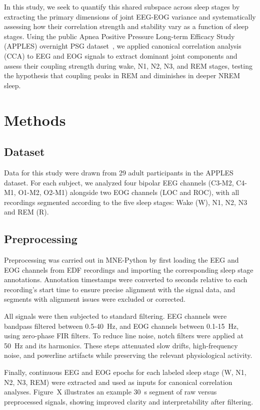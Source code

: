 In this study, we seek to quantify this shared subspace across sleep stages by extracting the primary dimensions of joint EEG-EOG variance and systematically assessing how their correlation strength and stability vary as a function of sleep stages. Using the public Apnea Positive Pressure Long-term Efficacy Study (APPLES) overnight PSG dataset~\cite{mueller_nsrr}, we applied canonical correlation analysis (CCA) to EEG and EOG signals to extract dominant joint components and assess their coupling strength during wake, N1, N2, N3, and REM stages, testing the hypothesis that coupling peaks in REM and diminishes in deeper NREM sleep.
 
\section{Methods}

\subsection{Dataset}

Data for this study were drawn from 29 adult participants in the APPLES dataset. For each subject, we analyzed four bipolar EEG channels (C3-M2, C4-M1, O1-M2, O2-M1) alongside two EOG channels (LOC and ROC), with all recordings segmented according to the five sleep stages: Wake (W), N1, N2, N3 and REM (R).

\subsection{Preprocessing}
Preprocessing was carried out in MNE-Python by first loading the EEG and EOG channels from EDF recordings and importing the corresponding sleep stage annotations. Annotation timestamps were converted to seconds relative to each recording's start time to ensure precise alignment with the signal data, and segments with alignment issues were excluded or corrected. 

All signals were then subjected to standard filtering. EEG channels were bandpass filtered between 0.5-40~Hz, and EOG channels between 0.1-15~Hz, using zero-phase FIR filters. To reduce line noise, notch filters were applied at 50~Hz and its harmonics. These steps attenuated slow drifts, high-frequency noise, and powerline artifacts while preserving the relevant physiological activity. 

Finally, continuous EEG and EOG epochs for each labeled sleep stage (W, N1, N2, N3, REM) were extracted and used as inputs for canonical correlation analyses. Figure~X illustrates an example 30~s segment of raw versus preprocessed signals, showing improved clarity and interpretability after filtering.

